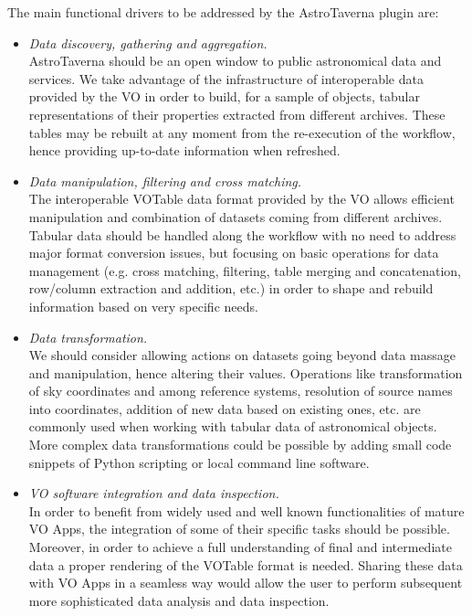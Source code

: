 \documentclass{aa}
\begin{document}
The main functional drivers to be addressed by the AstroTaverna plugin are:
\begin{itemize}
\item
\textit{Data discovery, gathering and aggregation.}\\
AstroTaverna should be an open window to public astronomical data and services. We take advantage of the infrastructure of interoperable data provided by the VO in order to build, for a sample of objects, tabular representations of their properties extracted from different archives. These tables may be rebuilt at any moment from the re-execution of the workflow, hence providing up-to-date information when refreshed.
\item
\textit{Data manipulation, filtering and cross matching.}\\
The interoperable VOTable \citep{Ochsenbein2009} data format provided by the VO allows efficient manipulation and combination of datasets coming from different archives. Tabular data should be handled along the workflow with no need to address major format conversion issues, but focusing on basic operations for data management (e.g. cross matching, filtering, table merging and concatenation, row/column extraction and addition, etc.) in order to shape and rebuild information based on very specific needs.
\item
\textit{Data transformation.}\\
We should consider allowing actions on datasets going beyond data massage and manipulation, hence altering their values. Operations like transformation of sky coordinates and among reference systems, resolution of source names into coordinates, addition of new data based on existing ones, etc. are commonly used when working with tabular data of astronomical objects. More complex data transformations could be possible by adding small code snippets of Python scripting or local command line software.
\item
\textit{VO software integration and data inspection.}\\
In order to benefit from widely used and well known functionalities of mature VO Apps, the integration of some of their specific tasks should be possible. Moreover, in order to achieve a full understanding of final and intermediate data a proper rendering of the VOTable format is needed. Sharing these data with VO Apps in a seamless way would allow the user to perform subsequent more sophisticated data analysis and data inspection.
\end{itemize}
\end{document}
